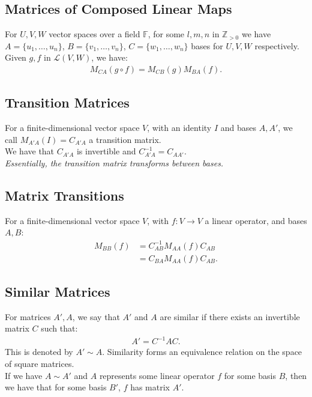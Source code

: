 \documentclass[a4paper, 12pt, twoside]{article}
\begin{document}
\subsection{Matrices of Composed Linear Maps}

For $U, V, W$ vector spaces over a field $\mathbb{F}$, for some
$l, m, n$ in $\mathbb{Z}_{>0}$ we have $A = \{u_1, \ldots, u_n\}$,
$B = \{v_1, \ldots, v_n\}$, $C = \{w_1, \ldots, w_n\}$ bases for 
$U, V, W$ respectively. Given $g, f$ in $\mathcal{L}(V, W)$, we have:
\begin{gather*}
  M_{CA}(g \circ f) = M_{CB}(g)M_{BA}(f).
\end{gather*}

\subsection{Transition Matrices}

For a finite-dimensional vector space $V$, with an identity $I$ 
and bases $A, A'$, we call $M_{A'A}(I) = C_{A'A}$ a transition
matrix.
\\[\baselineskip]
We have that $C_{A'A}$ is invertible and $C_{A'A}^{-1} = C_{AA'}$.
\\[\baselineskip]
\textit{Essentially, the transition matrix transforms between bases.}

\subsection{Matrix Transitions}

For a finite-dimensional vector space $V$, with $f:V \to V$ a linear
operator, and bases $A, B$: \begin{align*}
  M_{BB}(f) &= C_{AB}^{-1}M_{AA}(f)C_{AB} \\
  &= C_{BA}M_{AA}(f)C_{AB}.
\end{align*}

\subsection{Similar Matrices}

For matrices $A', A$, we say that $A'$ and $A$ are similar if there
exists an invertible matrix $C$ such that: \begin{gather*}
  A' = C^{-1}AC.
\end{gather*} This is denoted by $A' \sim A$. Similarity forms
an equivalence relation on the space of square matrices.
\\[\baselineskip]
If we have $A \sim A'$ and $A$ represents some linear operator $f$
for some basis $B$, then we have that for some basis $B'$, $f$ has
matrix $A'$.
\end{document}
